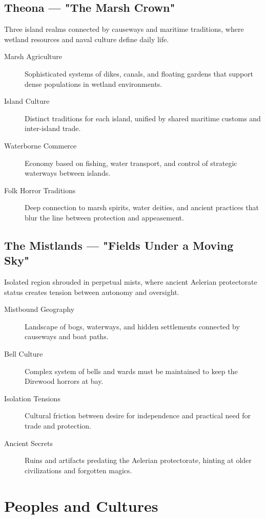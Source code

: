 \subsection*{Theona — "The Marsh Crown"}

Three island realms connected by causeways and maritime traditions, where wetland resources and naval culture define daily life.

\begin{description}
\item[Marsh Agriculture] Sophisticated systems of dikes, canals, and floating gardens that support dense populations in wetland environments.
\item[Island Culture] Distinct traditions for each island, unified by shared maritime customs and inter-island trade.
\item[Waterborne Commerce] Economy based on fishing, water transport, and control of strategic waterways between islands.
\item[Folk Horror Traditions] Deep connection to marsh spirits, water deities, and ancient practices that blur the line between protection and appeasement.
\end{description}

\subsection*{The Mistlands — "Fields Under a Moving Sky"}

Isolated region shrouded in perpetual mists, where ancient Aelerian protectorate status creates tension between autonomy and oversight.

\begin{description}
\item[Mistbound Geography] Landscape of bogs, waterways, and hidden settlements connected by causeways and boat paths.
\item[Bell Culture] Complex system of bells and wards must be maintained to keep the Direwood horrors at bay.
\item[Isolation Tensions] Cultural friction between desire for independence and practical need for trade and protection.
\item[Ancient Secrets] Ruins and artifacts predating the Aelerian protectorate, hinting at older civilizations and forgotten magics.
\end{description}

\section{Peoples and Cultures}

